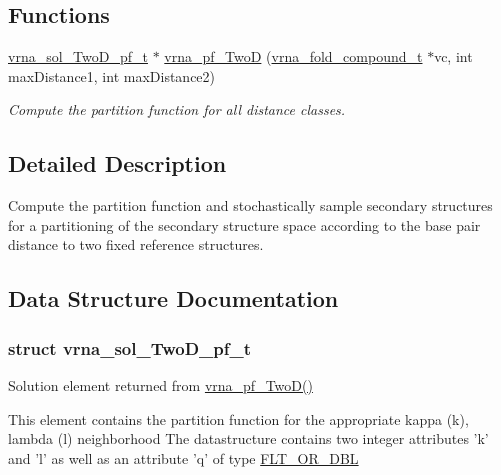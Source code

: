 \subsection*{Functions}
\begin{DoxyCompactItemize}
\item 
\hyperlink{group__kl__neighborhood__pf_structvrna__sol__TwoD__pf__t}{vrna\+\_\+sol\+\_\+\+Two\+D\+\_\+pf\+\_\+t} $\ast$ \hyperlink{group__kl__neighborhood__pf_ga0bc3427689bd09da09b8b3094a27f836}{vrna\+\_\+pf\+\_\+\+Two\+D} (\hyperlink{group__fold__compound_ga1b0cef17fd40466cef5968eaeeff6166}{vrna\+\_\+fold\+\_\+compound\+\_\+t} $\ast$vc, int max\+Distance1, int max\+Distance2)
\begin{DoxyCompactList}\small\item\em Compute the partition function for all distance classes. \end{DoxyCompactList}\end{DoxyCompactItemize}


\subsection{Detailed Description}
Compute the partition function and stochastically sample secondary structures for a partitioning of the secondary structure space according to the base pair distance to two fixed reference structures. 



\subsection{Data Structure Documentation}
\label{structvrna__sol__TwoD__pf__t}
\hypertarget{group__kl__neighborhood__pf_structvrna__sol__TwoD__pf__t}{}
\subsubsection{struct vrna\+\_\+sol\+\_\+\+Two\+D\+\_\+pf\+\_\+t}
Solution element returned from \hyperlink{group__kl__neighborhood__pf_ga0bc3427689bd09da09b8b3094a27f836}{vrna\+\_\+pf\+\_\+\+Two\+D()} 

This element contains the partition function for the appropriate kappa (k), lambda (l) neighborhood The datastructure contains two integer attributes 'k' and 'l' as well as an attribute 'q' of type \hyperlink{group__data__structures_ga31125aeace516926bf7f251f759b6126}{F\+L\+T\+\_\+\+O\+R\+\_\+\+D\+B\+L}

